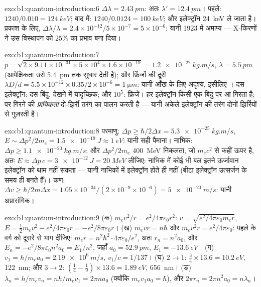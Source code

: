 \begin{solution}{exo:b1:quantum-introduction:6}
$\Delta\lambda = \qty{2.43}{pm}$: अतः $\lambda' = \qty{12.4}{pm}$। पहले: $1240/0.010 =
\qty{124}{keV}$; बाद में: $1240/0.0124 = \qty{100}{keV}$; और इलेक्ट्रॉन
\qty{24}{keV} ले जाता है। प्रकाश के लिए, $\Delta\lambda/\lambda = 2.4 \times 10^{-12}/5 \times 10^{-7} = 5 \times
10^{-6}$: यानी 1923 में अमाप्य --- X-किरणों ने उस विस्थापन को $25\%$ का प्रभाव बना दिया।
\end{solution}

\begin{solution}{exo:b1:quantum-introduction:7}
$p = \sqrt{2 \times 9.11 \times 10^{-31} \times 5 \times 10^4 \times 1.6 \times 10^{-19}} =
\qty{1.2e-22}{kg.m/s}$, $\lambda = \qty{5.5}{pm}$ (आपेक्षिकता उसे
\qty{5.4}{pm} तक सुधार देती है); और फ्रिंजों की दूरी $\lambda D/d = 5.5 \times 10^{-12} \times 0.35/2 \times 10^{-6}
= \qty{1}{\micro m}$: यानी आँख के लिए अदृश्य, इसीलिए  । दस
इलेक्ट्रॉन: दस बिंदु, देखने में यादृच्छिक; और $10^5$: फ्रिंजें। हर
इलेक्ट्रॉन किसी एक बिंदु पर आ गिरता है; पर गिरने की \emph{प्रायिकता}
दो-झिर्री तरंग का पालन करती है --- यानी अकेले इलेक्ट्रॉन की तरंग दोनों
झिर्रियों से गुज़रती है।
\end{solution}

\begin{solution}{exo:b1:quantum-introduction:8}
परमाणु: $\Delta p \geq \hbar/2\Delta x = \qty{5.3e-25}{kg.m/s}$, $E \sim \Delta p^2/2m_e =
\qty{1.5e-19}{J} \approx \qty{1}{eV}$: यानी सही पैमाना। नाभिक: $\Delta p \geq
\qty{1.1e-20}{kg.m/s}$; और $\Delta p^2/2m_e$ \qty{400}{MeV} निकलता, जो
$m_ec^2$ से कहीं ऊपर है, अतः $E \approx \Delta p\,c = \qty{3e-12}{J} = \qty{20}{MeV}$
लीजिए: नाभिक में कोई भी बल इतने ऊर्जावान इलेक्ट्रॉन को थाम नहीं सकता ---
यानी नाभिकों में इलेक्ट्रॉन होते ही नहीं (बीटा इलेक्ट्रॉन उत्सर्जन के समय ही
बनते हैं)। कण: $\Delta v \geq
\hbar/2m\Delta x = 1.05 \times 10^{-34}/(2 \times 10^{-9} \times 10^{-6}) = \qty{5e-20}{m/s}$:
यानी अप्रासंगिक।
\end{solution}

\begin{solution}{exo:b1:quantum-introduction:9}
(क) $m_ev^2/r = e^2/4\pi\varepsilon_0r^2$: $v = \sqrt{e^2/4\pi\varepsilon_0m_er}$, $E =
\tfrac12m_ev^2 - e^2/4\pi\varepsilon_0r = -e^2/8\pi\varepsilon_0r$। (ख) $m_evr = n\hbar$ और
$m_ev^2r = e^2/4\pi\varepsilon_0$: पहले के वर्ग को दूसरे से भाग दीजिए:
$m_er = n^2\hbar^2 \cdot 4\pi\varepsilon_0/e^2$, अतः $r_n = n^2a_0$, और $E_n = -e^2/8\pi\varepsilon_0n^2a_0
= E_1/n^2$, जहाँ $a_0 = \qty{52.9}{pm}$, $E_1 = \qty{-13.6}{eV}$। (ग) $v_1 =
\hbar/m_ea_0 = \qty{2.19e6}{m/s}$, $v_1/c = 1/137$। (घ) $2 \to 1$: $\tfrac34 \times
13.6 = \qty{10.2}{eV}$, \qty{122}{nm}; और $3 \to 2$: $(\tfrac14 - \tfrac19) \times 13.6 =
\qty{1.89}{eV}$, \qty{656}{nm}। (ङ) $\lambda_n = h/m_ev_n = nh/m_ev_1 = 2\pi na_0$
(क्योंकि $m_ev_1a_0 = \hbar$), और $2\pi r_n = 2\pi n^2a_0 = n\lambda_n$।
\end{solution}

